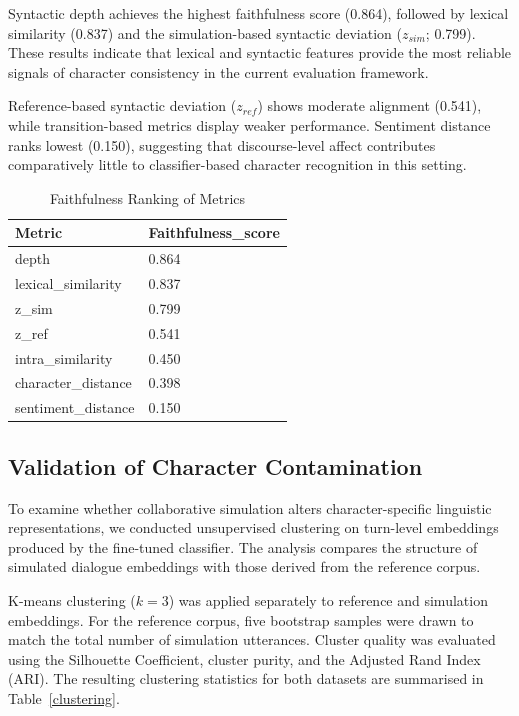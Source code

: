 \documentclass{article}
\begin{document}
Syntactic depth achieves the highest faithfulness score (0.864), followed by lexical similarity (0.837) and the simulation-based syntactic deviation ($z_{sim}$; 0.799). These results indicate that lexical and syntactic features provide the most reliable signals of character consistency in the current evaluation framework.

Reference-based syntactic deviation ($z_{ref}$) shows moderate alignment (0.541), while transition-based metrics display weaker performance. Sentiment distance ranks lowest (0.150), suggesting that discourse-level affect contributes comparatively little to classifier-based character recognition in this setting.

\begin{table}[H]
\centering
\begin{tabular}{l l}\toprule
Metric& Faithfulness\_score\\\midrule
depth & 0.864 \\
lexical\_similarity & 0.837 \\
z\_sim & 0.799 \\
z\_ref & 0.541 \\
intra\_similarity & 0.450 \\
character\_distance & 0.398 \\
sentiment\_distance & 0.150 \\ \bottomrule
\end{tabular}
\caption{Faithfulness Ranking of Metrics}
\label{ranking}
\end{table}


\subsection{Validation of Character Contamination}

To examine whether collaborative simulation alters character-specific linguistic representations, we conducted unsupervised clustering on turn-level embeddings produced by the fine-tuned classifier. The analysis compares the structure of simulated dialogue embeddings with those derived from the reference corpus.

K-means clustering ($k=3$) was applied separately to reference and simulation embeddings. For the reference corpus, five bootstrap samples were drawn to match the total number of simulation utterances. Cluster quality was evaluated using the Silhouette Coefficient, cluster purity, and the Adjusted Rand Index (ARI). The resulting clustering statistics for both datasets are summarised in Table~\ref{clustering}.
\end{document}
